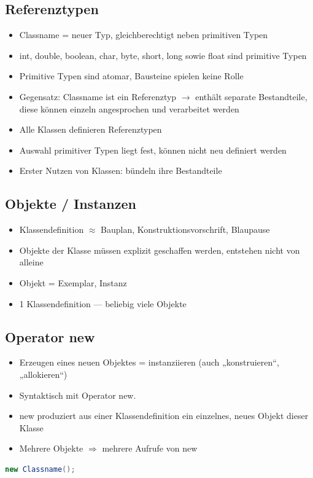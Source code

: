 \subsection{Referenztypen}
\begin{itemize}
\item Classname = neuer Typ, gleichberechtigt neben primitiven Typen
\item int, double, boolean, char, byte, short, long sowie float sind primitive Typen
\item Primitive Typen sind atomar, Bausteine spielen keine Rolle
\item Gegensatz: Classname ist ein Referenztyp $\rightarrow$ enthält separate Bestandteile, diese können einzeln angesprochen und verarbeitet werden
\item Alle Klassen definieren Referenztypen
\item Auswahl primitiver Typen liegt fest, können nicht neu definiert werden
\item Erster Nutzen von Klassen: bündeln ihre Bestandteile
\end{itemize}

\subsection{Objekte / Instanzen}
\begin{itemize}
\item Klassendefinition $\approx$ Bauplan, Konstruktionsvorschrift, Blaupause
\item Objekte der Klasse müssen explizit geschaffen werden, entstehen nicht von alleine
\item  Objekt = Exemplar, Instanz
\item 1 Klassendefinition — beliebig viele Objekte
\end{itemize}

\subsection{Operator new}
\begin{itemize}
\item Erzeugen eines neuen Objektes = instanziieren (auch „konstruieren“, „allokieren“)
\item Syntaktisch mit Operator new.
\item new produziert aus einer Klassendefinition ein einzelnes, neues Objekt dieser Klasse
\item Mehrere Objekte $\Rightarrow$ mehrere Aufrufe von new
\end{itemize}
 \begin{lstlisting}[language=JAVA]
new Classname();
\end{lstlisting}

